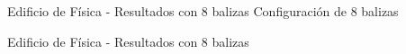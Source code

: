 \documentclass[xcolor=table]{beamer}
\begin{document}
  \begin{frame}{Edificio de Física - Resultados con 8 balizas}
    Configuración de 8 balizas
    \begin{figure}[H]
      \centering
      \def\svgwidth{0.5\linewidth}
       
      \label{fig:sensores_fisica_8}
    \end{figure}
  \end{frame}

  \begin{frame}{Edificio de Física - Resultados con 8 balizas}
    \begin{figure}[H]
      \centering
      \scalebox{0.6}{}
      \label{fig:res_fisica_8}
  \end{figure}
  \end{frame}
\end{document}
